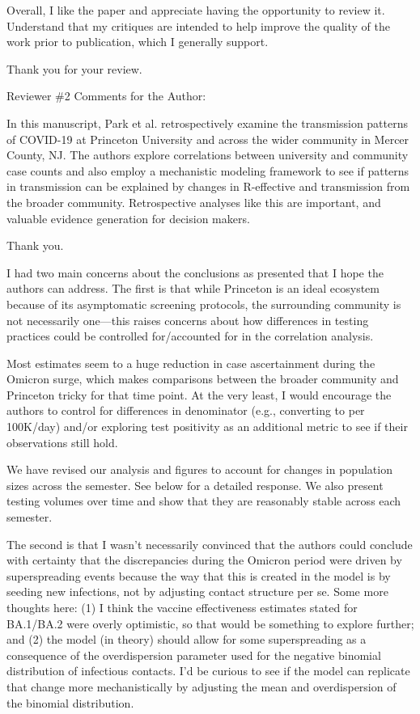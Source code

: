 \documentclass[12pt]{article}
\newcommand{\revtext}{\textsf}
\begin{document}
\revtext{Overall, I like the paper and appreciate having the opportunity to review it. Understand that my critiques are intended to help improve the quality of the work prior to publication, which I generally support.}

Thank you for your review.

\revtext{Reviewer \#2 Comments for the Author:} 

\revtext{In this manuscript, Park et al. retrospectively examine the transmission patterns of COVID-19 at Princeton University and across the wider community in Mercer County, NJ. The authors explore correlations between university and community case counts and also employ a mechanistic modeling framework to see if patterns in transmission can be explained by changes in R-effective and transmission from the broader community. Retrospective analyses like this are important, and valuable evidence generation for decision makers.}

Thank you.

\revtext{I had two main concerns about the conclusions as presented that I hope the authors can address. The first is that while Princeton is an ideal ecosystem because of its asymptomatic screening protocols, the surrounding community is not necessarily one—this raises concerns about how differences in testing practices could be controlled for/accounted for in the correlation analysis.} 

\revtext{Most estimates seem to a huge reduction in case ascertainment during the Omicron surge, which makes comparisons between the broader community and Princeton tricky for that time point. At the very least, I would encourage the authors to control for differences in denominator (e.g., converting to per 100K/day) and/or exploring test positivity as an additional metric to see if their observations still hold.}

We have revised our analysis and figures to account for changes in population sizes across the semester. See below for a detailed response.
We also present testing volumes over time and show that they are reasonably stable across each semester.

\revtext{The second is that I wasn’t necessarily convinced that the authors could conclude with certainty that the discrepancies during the Omicron period were driven by superspreading events because the way that this is created in the model is by seeding new infections, not by adjusting contact structure per se. Some more thoughts here: (1) I think the vaccine effectiveness estimates stated for BA.1/BA.2 were overly optimistic, so that would be something to explore further; and (2) the model (in theory) should allow for some superspreading as a consequence of the overdispersion parameter used for the negative binomial distribution of infectious contacts. I’d be curious to see if the model can replicate that change more mechanistically by adjusting the mean and overdispersion of the binomial distribution.} 
\end{document}
